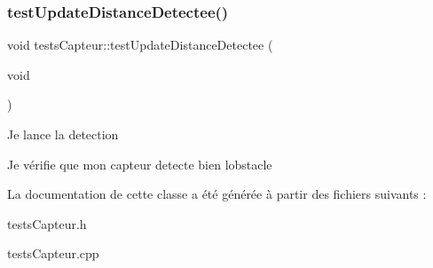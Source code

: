 \subsubsection{\texorpdfstring{test\+Update\+Distance\+Detectee()}{testUpdateDistanceDetectee()}}
{\footnotesize\ttfamily void tests\+Capteur\+::test\+Update\+Distance\+Detectee (\begin{DoxyParamCaption}\item[{void}]{ }\end{DoxyParamCaption})\hspace{0.3cm}{\ttfamily [protected]}}

Je lance la detection

Je vérifie que mon capteur detecte bien l\textquotesingle{}obstacle 

La documentation de cette classe a été générée à partir des fichiers suivants \+:\begin{DoxyCompactItemize}
\item 
tests\+Capteur.\+h\item 
tests\+Capteur.\+cpp\end{DoxyCompactItemize}

